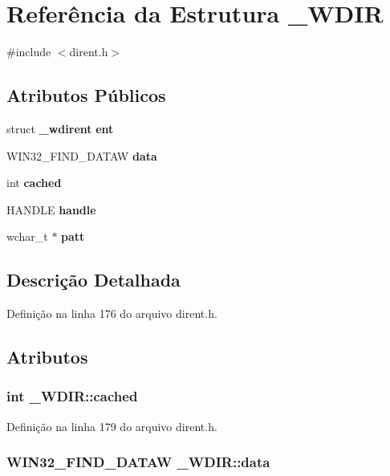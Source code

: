 \section{Referência da Estrutura \+\_\+\+W\+D\+IR}
\label{struct___w_d_i_r}


{\ttfamily \#include $<$dirent.\+h$>$}

\subsection*{Atributos Públicos}
\begin{DoxyCompactItemize}
\item 
struct {\bf \+\_\+wdirent} {\bf ent}
\item 
W\+I\+N32\+\_\+\+F\+I\+N\+D\+\_\+\+D\+A\+T\+AW {\bf data}
\item 
int {\bf cached}
\item 
H\+A\+N\+D\+LE {\bf handle}
\item 
wchar\+\_\+t $\ast$ {\bf patt}
\end{DoxyCompactItemize}


\subsection{Descrição Detalhada}


Definição na linha 176 do arquivo dirent.\+h.



\subsection{Atributos}
\subsubsection[{cached}]{\setlength{\rightskip}{0pt plus 5cm}int \+\_\+\+W\+D\+I\+R\+::cached}\label{struct___w_d_i_r_a9b7432df163d1e291ba5925347fd4af3}


Definição na linha 179 do arquivo dirent.\+h.

\subsubsection[{data}]{\setlength{\rightskip}{0pt plus 5cm}W\+I\+N32\+\_\+\+F\+I\+N\+D\+\_\+\+D\+A\+T\+AW \+\_\+\+W\+D\+I\+R\+::data}\label{struct___w_d_i_r_a065b17b666ee06c4e8068d8accb0eef9}


